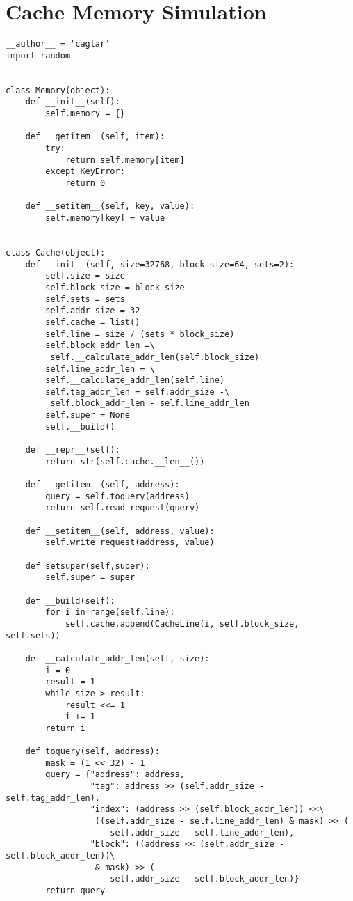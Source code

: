 \chapter{Cache Memory Simulation}
\lstset{language=Python} 
\begin{lstlisting}
__author__ = 'caglar'
import random


class Memory(object):
    def __init__(self):
        self.memory = {}

    def __getitem__(self, item):
        try:
            return self.memory[item]
        except KeyError:
            return 0

    def __setitem__(self, key, value):
        self.memory[key] = value


class Cache(object):
    def __init__(self, size=32768, block_size=64, sets=2):
        self.size = size
        self.block_size = block_size
        self.sets = sets
        self.addr_size = 32
        self.cache = list()
        self.line = size / (sets * block_size)
        self.block_addr_len =\
         self.__calculate_addr_len(self.block_size)
        self.line_addr_len = \
        self.__calculate_addr_len(self.line)
        self.tag_addr_len = self.addr_size -\
         self.block_addr_len - self.line_addr_len
        self.super = None
        self.__build()

    def __repr__(self):
        return str(self.cache.__len__())

    def __getitem__(self, address):
        query = self.toquery(address)
        return self.read_request(query)

    def __setitem__(self, address, value):
        self.write_request(address, value)

    def setsuper(self,super):
        self.super = super

    def __build(self):
        for i in range(self.line):
            self.cache.append(CacheLine(i, self.block_size, self.sets))

    def __calculate_addr_len(self, size):
        i = 0
        result = 1
        while size > result:
            result <<= 1
            i += 1
        return i

    def toquery(self, address):
        mask = (1 << 32) - 1
        query = {"address": address,
                 "tag": address >> (self.addr_size - self.tag_addr_len),
                 "index": (address >> (self.block_addr_len)) <<\
                  ((self.addr_size - self.line_addr_len) & mask) >> (
                     self.addr_size - self.line_addr_len),
                 "block": ((address << (self.addr_size - self.block_addr_len))\
                  & mask) >> (
                     self.addr_size - self.block_addr_len)}
        return query


\end{lstlisting}
